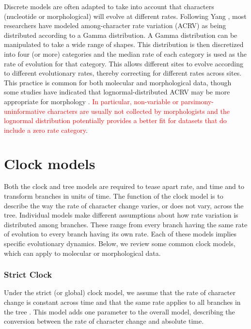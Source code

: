 \documentclass[11pt]{article}
\newcommand{\rw}[1]{{\textcolor{red}{[RW: #1]}}} %
\newcommand{\edit}[1]{{\textcolor{red}{#1}}} %
\newcommand{\aw}[1]{{\textcolor{armygreen}{[AW: #1]}}} %
\begin{document}
Discrete models are often adapted to take into account that characters (nucleotide or morphological) will evolve at different rates. Following Yang \cite{Yang1994a}, 
most researchers have modeled among-character rate variation (ACRV) as being distributed according to a Gamma distribution.
A Gamma distribution can be manipulated to take a wide range of shapes.
This distribution is then discretized into four (or more) categories and the median rate of each category is used as the rate of evolution for that category.
This allows different sites to evolve according to different evolutionary rates, thereby correcting for different rates across sites.
This practice is common for both molecular and morphological data, though some studies have indicated that lognormal-distributed ACRV may be more appropriate for morphology \cite{wagner2011, Harrison2015}. %
\edit{In particular, non-variable or parsimony-uninformative  characters are usually not collected by morphologists and the lognormal distribution potentially provides a better fit for datasets that do include a zero rate category}.


\section{Clock models}
Both the clock and tree models are required to tease apart rate, and time and to transform branches in units of time.
The function of the clock model is to describe the way the rate of character change varies, or does not vary, across the tree.
Individual models make different assumptions about how rate variation is distributed among branches.
These range from  every branch having the same rate of evolution to every branch having its own rate.
Each of these models implies specific evolutionary dynamics.
Below, we review some common clock models, which can apply to molecular or morphological data.

\subsubsection{Strict Clock}
Under the strict (or global) clock model, we assume that the rate of character change is constant across time and that the same rate applies to all branches in the tree \cite{Zuckerkandl1962, Zuckerkandl1965EvolutionaryDivergenceConvergence}.
This model adds one parameter to the overall model, describing the conversion between the rate of character change  and absolute time.
\end{document}
